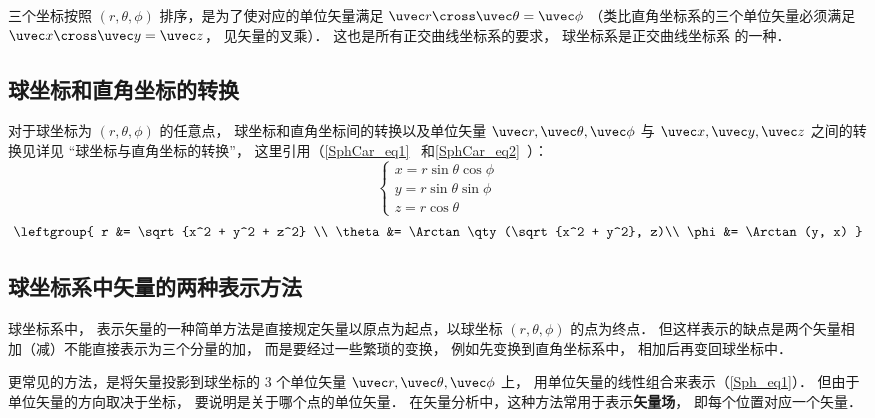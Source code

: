 三个坐标按照 $(r, \theta , \phi )$ 排序，是为了使对应的单位矢量满足 $\uvec r \cross \uvec \theta  = \uvec \phi $ （类比直角坐标系的三个单位矢量必须满足 $\uvec x \cross \uvec y = \uvec z$， 见矢量的叉乘）． 这也是所有正交曲线坐标系的要求， 球坐标系是正交曲线坐标系 的一种．

\subsection{球坐标和直角坐标的转换}
对于球坐标为 $(r, \theta , \phi )$ 的任意点， 球坐标和直角坐标间的转换以及单位矢量 $\uvec r, \uvec \theta, \uvec \phi$  与 $\uvec x, \uvec y, \uvec z$ 之间的转换见详见 “球坐标与直角坐标的转换”， 这里引用（\autoref{SphCar_eq1}~ 和\autoref{SphCar_eq2}~）：
\begin{equation}
\begin{cases}
x = r\sin \theta \cos \phi \\
y = r\sin \theta \sin \phi \\
z = r\cos \theta 
\end{cases}
\end{equation}
\begin{equation}
\leftgroup{
r &= \sqrt {x^2 + y^2 + z^2} \\
\theta  &= \Arctan\qty(\sqrt{x^2 + y^2}, z)\\
\phi  &= \Arctan(y, x)
}\end{equation}


 
\subsection{球坐标系中矢量的两种表示方法}
球坐标系中， 表示矢量的一种简单方法是直接规定矢量以原点为起点，以球坐标 $(r, \theta, \phi)$ 的点为终点． 但这样表示的缺点是两个矢量相加（减）不能直接表示为三个分量的加， 而是要经过一些繁琐的变换， 例如先变换到直角坐标系中， 相加后再变回球坐标中．

更常见的方法，是将矢量投影到球坐标的 3 个单位矢量 $\uvec r, \uvec \theta, \uvec \phi$ 上， 用单位矢量的线性组合来表示（\autoref{Sph_eq1}）． 但由于单位矢量的方向取决于坐标， 要说明是关于哪个点的单位矢量． 在矢量分析中，这种方法常用于表示\textbf{矢量场}， 即每个位置对应一个矢量．

